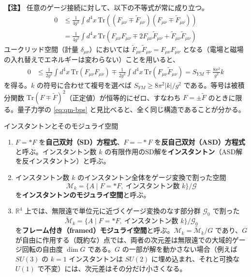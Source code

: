 \documentclass[uplatex, dvipdfmx, book]{jsbook}
\newenvironment{note}{\vspace{1ex}\par\footnotesize\noindent\textbf{【注】}}{\par\vspace{1ex}}
\begin{document}
\begin{note}
任意のゲージ接続に対して、以下の不等式が常に成り立つ。
\begin{align*}
    0 &\le \frac{1}{4g^2} \int d^4x \, \mathrm{Tr}\left( (F_{\mu\nu} \mp \tilde{F}_{\mu\nu})(F_{\mu\nu} \mp \tilde{F}_{\mu\nu}) \right) \\
    &= \frac{1}{4g^2} \int d^4x \, \mathrm{Tr}\left( F_{\mu\nu} F_{\mu\nu} \mp 2F_{\mu\nu} \tilde{F}_{\mu\nu} + \tilde{F}_{\mu\nu} \tilde{F}_{\mu\nu} \right)
\end{align*}
ユークリッド空間（計量 $\delta_{\mu\nu}$）においては $\tilde{F}_{\mu\nu} \tilde{F}_{\mu\nu} = F_{\mu\nu} F_{\mu\nu}$ となる（電場と磁場の入れ替えでエネルギーは変わらない）ことを用いると、
\begin{align*}
    0 &\le \frac{1}{2g^2} \int d^4x \, \mathrm{Tr}(F_{\mu\nu} F_{\mu\nu}) \mp \frac{1}{2g^2} \int d^4x \, \mathrm{Tr}(F_{\mu\nu} \tilde{F}_{\mu\nu}) = S_{YM} \mp \frac{8\pi^2}{g^2} k
\end{align*}
を得る。$k$ の符号に合わせて複号を選べば $S_{YM} \ge 8\pi^2|k|/g^2$ である。等号は被積分関数 $\mathrm{Tr}(F \mp \tilde{F})^2$（正定値）が恒等的にゼロ、すなわち $F = \pm\tilde{F}$ のときに限る。量子力学の \eqref{eq:qm-bps} と見比べると、全く同じ構造であることが分かる。
\end{note}

\begin{mydef}{インスタントンとそのモジュライ空間}{}
\begin{enumerate}
    \item $F = *F$ を\textbf{自己双対（SD）方程式}、$F = -*F$ を\textbf{反自己双対（ASD）方程式}と呼ぶ。インスタントン数 $k$ の有限作用のSD解を\textbf{インスタントン}（ASD解を反インスタントン）と呼ぶ。
    \item インスタントン数 $k$ のインスタントン全体をゲージ変換で割った空間
    \begin{equation*}
        \mathcal{M}_k = \{ A \mid F = *F,\ \text{インスタントン数 } k \} / \mathcal{G}
    \end{equation*}
    を\textbf{インスタントンのモジュライ空間}と呼ぶ。
    \item $\mathbb{R}^4$ 上では、無限遠で単位元に近づくゲージ変換のなす部分群 $\mathcal{G}_0$ で割った
    \begin{equation*}
        \widetilde{\mathcal{M}}_k = \{ A \mid F = *F,\ \text{インスタントン数 } k \} / \mathcal{G}_0
    \end{equation*}
    を\textbf{フレーム付き（framed）モジュライ空間}と呼ぶ。$\mathcal{M}_k = \widetilde{\mathcal{M}}_k / G$ であり、$G$ が自由に作用する（既約な）点では、両者の次元差は無限遠での大域的ゲージ回転の自由度 $\dim G$ である。$G$ の一部が解を動かさない場合（例えば $SU(3)$ の $k = 1$ インスタントンは $SU(2)$ に埋め込まれ、それと可換な $U(1)$ で不変）には、次元差はその分だけ小さくなる。
\end{enumerate}
\end{mydef}
\end{document}
